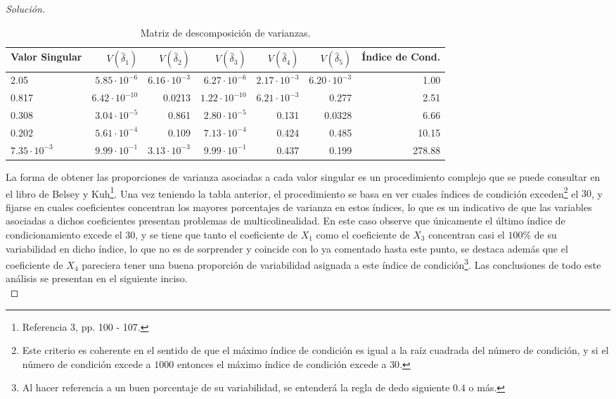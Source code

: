 \documentclass[10.5pt,notitlepage]{article}
\newenvironment{solucion}
  {\begin{proof}[Solución]}
  {\end{proof}}
\theoremstyle{plain}
\begin{document}
\begin{solucion}
\begin{table}[H]
{\begin{tabular}{@{}l@{\hskip 0.3in}r@{\hskip 0.3in}r@{\hskip 0.3in}r@{\hskip 0.3in}r@{\hskip 0.3in}r@{\hskip 0.3in}r@{}}
\toprule
Valor Singular& \(V(\hat{\delta}_1)\)  & \(V(\hat{\delta}_2)\)  & \(V(\hat{\delta}_3)\) & \(V(\hat{\delta}_4)\) & \(V(\hat{\delta}_5)\)&  Índice de Cond.\\
\midrule
2.05  &  \(5.85\cdot10^{-6}\) &\(6.16\cdot 10^{-3}\)& \(6.27\cdot 10^{- 6}\)& \(2.17\cdot 10^{-3}\)& \(6.20\cdot 10^{-3}\)  &           1.00\\  
0.817 &  \(6.42\cdot10^{-10}\) &0.0213 & \(1.22\cdot 10^{- 10}\) & \(6.21\cdot 10^{-3}\)& 0.277 &              2.51\\
0.308 &  \(3.04\cdot10^{-5}\) &0.861 &  \(2.80\cdot 10^{- 5}\) & 0.131   &0.0328    &          6.66\\
0.202  & \(5.61\cdot10^{-4}\) &0.109  &\(7.13\cdot 10^{- 4}\) & 0.424   &0.485       &       10.15\\
\(7.35\cdot10^{-3}\) &\(9.99\cdot 10^{- 1}\)& \(3.13\cdot 10^{-3}\)& \(9.99\cdot10^{-1}\) &0.437 &  0.199&             278.88\\
            \bottomrule
        \end{tabular}}
\caption{Matriz de descomposición de varianzas.}
\label{tab:ref3}
\end{table}
La forma de obtener las proporciones de varianza asociadas a cada valor singular es un procedimiento complejo que se puede consultar en el libro de Belsey y Kuh\footnote{Referencia 3, pp. 100 - 107.}. Una vez teniendo la tabla anterior, el procedimiento se basa en ver cuales índices de condición exceden\footnote{Este criterio es coherente en el sentido de que el máximo índice de condición es igual a la raíz cuadrada del número de condición, y si el número de condición excede a \(1000\) entonces el máximo índice de condición excede a \(30\).} el \(30\), y fijarse en cuales coeficientes concentran los mayores porcentajes de varianza en estos índices, lo que es un indicativo de que las variables asociadas a dichos coeficientes presentan problemas de multicolinealidad. En este caso observe que únicamente el último índice de condicionamiento excede el \(30\), y se tiene que tanto el coeficiente de \(X_1\) como el coeficiente de \(X_3\) concentran casi el \(100\%\) de su variabilidad en dicho índice, lo que no es de sorprender y coincide con lo ya comentado hasta este punto, se destaca además que el coeficiente de \(X_4\) pareciera tener una buena proporción de variabilidad asignada a este índice de condición\footnote{Al hacer referencia a un buen porcentaje de su variabilidad, se entenderá la regla de dedo siguiente \(0.4\) o más.}. Las conclusiones de todo este análisis se presentan en el siguiente inciso. \\ 


\end{solucion}
\end{document}
